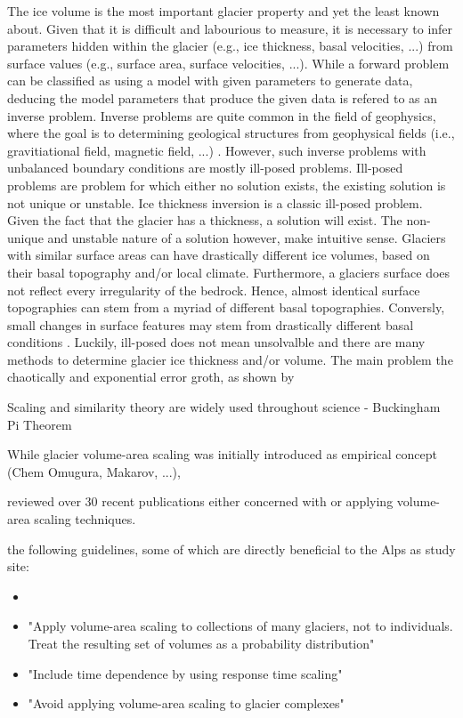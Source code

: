 \documentclass[12pt, a4paper, abstract=off, oneside]{scrartcl}
\begin{document}
        The ice volume is the most important glacier property and yet the least known about. Given that it is difficult and labourious to measure, it is necessary to infer parameters hidden within the glacier (e.g., ice thickness, basal velocities, ...) from surface values (e.g., surface area, surface velocities, ...). While a forward problem can be classified as using a model with given parameters to generate data, deducing the model parameters that produce the given data is refered to as an inverse problem. Inverse problems are quite common in the field of geophysics, where the goal is to determining geological structures from geophysical fields (i.e., gravitiational field, magnetic field, ...) \citep{Zhdanov2002}. However, such inverse problems with unbalanced boundary conditions are mostly ill-posed problems. Ill-posed problems are problem for which either no solution exists, the existing solution is not unique or unstable. Ice thickness inversion is a classic ill-posed problem. Given the fact that the glacier has a thickness, a solution will exist. The non-unique and unstable nature of a solution however, make intuitive sense. Glaciers with similar surface areas can have drastically different ice volumes, based on their basal topography and/or local climate. Furthermore, a glaciers surface does not reflect every irregularity of the bedrock. Hence, almost identical surface topographies can stem from a myriad of different basal topographies. Conversly, small changes in surface features may stem from drastically different basal conditions \citep{Bahr2014}. Luckily, ill-posed does not mean unsolvalble and there are many methods to determine glacier ice thickness and/or volume. 
        The main problem the chaotically and exponential error groth, as shown by \cite{Bahr1994}


        Scaling and similarity theory are widely used throughout science - Buckingham Pi Theorem


        While glacier volume-area scaling was initially introduced as empirical concept (Chem Omugura, Makarov, ...),
        
        \citet{Bahr2015} reviewed over 30 recent publications either concerned with or applying volume-area scaling techniques.

        the following guidelines, some of which are directly beneficial to the Alps as study site:
        \begin{itemize}
            \item 
            \item "Apply volume-area scaling to collections of many glaciers, not to individuals. Treat the resulting set of volumes as a probability distribution"
            \item "Include time dependence by using response time scaling"
            \item "Avoid applying volume-area scaling to glacier complexes"
        \end{itemize}
    
\end{document}
